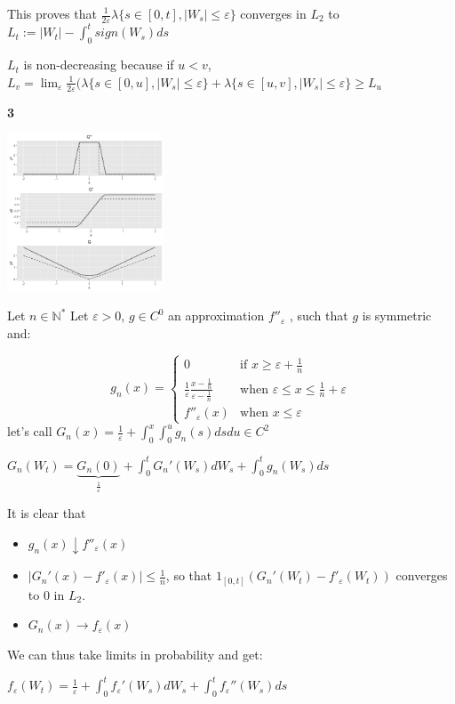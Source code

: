 \documentclass[11pt]{article}
\begin{document}
This proves that \(\frac1{2\varepsilon}  \lambda\{s \in [0, t], |W_s| \le \varepsilon\}\) converges in \(L_2\) to \(L_t := |W_t| - \int_0^t sign(W_s)ds\)

\(L_t\) is non-decreasing because if \(u < v\), \(L_{v} = \lim_{\varepsilon}\frac1{2\varepsilon}  (\lambda\{s \in [0, u], |W_s| \le \varepsilon\} + \lambda\{s \in [u, v], |W_s| \le \varepsilon\} \ge L_u\)

\textbf{3}

\begin{org}
\begin{center}
\includegraphics[width=0.35\textwidth]{approximation.png}
\end{center}
\end{org}






Let \(n \in \mathbb N^*\) 
Let \(\varepsilon > 0\), \(g \in C^0\) an approximation \(f''_{\varepsilon}\) , such that \(g\) is symmetric and:

\[g_n(x) = \left\{\begin{array}{cc}
0 & \text{if } x \ge \varepsilon + \frac1n \\
\frac1{\varepsilon} \frac{x-\frac1n}{\varepsilon - \frac1n}& \text{when } \varepsilon \le x \le \frac1n + \varepsilon\\
f''_{\varepsilon}(x) & \text{when } x \le \varepsilon
\end{array}\right.
\]
let's call \(G_n(x) = \frac1{\varepsilon} + \int_0^x \int_0^u g_n(s) ds du \in C^2\) 

\(G_n(W_t) = \underbrace{G_n(0)}_{\frac1{\varepsilon}} + \int_0^t G_n'(W_s) dW_s + \int_0^t g_n(W_s) ds\)

It is clear that
\begin{itemize}
\item \(g_n(x) \downarrow f''_{\varepsilon}(x)\)
\item \(|G_n'(x) - f'_{\varepsilon}(x)| \le \frac1n\), so that \(1_{[0, t]} (G_n'(W_t) - f'_{\varepsilon}(W_t))\) converges to \(0\) in \(L_2\).
\item \(G_n(x) \rightarrow f_{\varepsilon}(x)\)
\end{itemize}

We can thus take limits in probability and get:

\(f_{\varepsilon}(W_t) = \frac1{\varepsilon} + \int_0^t f_{\varepsilon}'(W_s) dW_s + \int_0^t f_{\varepsilon}''(W_s) ds\)
\end{document}
